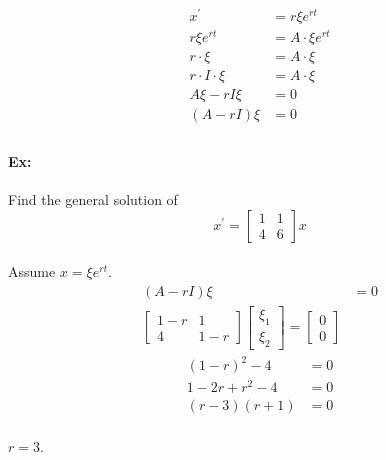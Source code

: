 \documentclass[letterpaper,12pt]{article}
\begin{document}
\begin{align*}
    x^{\prime} &= r\xi e^{rt}\\
    r\xi e^{rt}  &= A \cdot \xi e^{rt}\\
                r \cdot \xi&= A\cdot \xi\\
                           r \cdot I \cdot \xi&=A\cdot \xi\\
                                              A\xi - rI\xi&= 0\\
                                              (A-rI)\xi&=0\\
\end{align*}

\paragraph{Ex:}Find the general solution of 
\[
    x^{\prime}=
    \begin{bmatrix}
        1&1\\
        4&6
    \end{bmatrix}x
\]
\paragraph{}Assume $x = \xi e^{rt}$.
\begin{align*}
    (A-rI)\xi &= 0\\
    \begin{bmatrix}
        1-r & 1 \\
        4 & 1-r
    \end{bmatrix} 
              \begin{bmatrix}
                  \xi_1\\ \xi_2
              \end{bmatrix}= \begin{bmatrix}
    0\\0
    \end{bmatrix}
\end{align*}
\begin{align*}
    (1-r)^2 - 4 &= 0\\
    1-2r +r^2 -4&= 0\\
    (r-3)(r+1) &= 0
\end{align*}
\paragraph{}$r=3$.
\makeatletter
\renewcommand*\env@matrix[1][*\c@MaxMatrixCols c]{%
\hskip -\arraycolsep
\let\@ifnextchar\new@ifnextchar
\array{#1}}
\makeatother
\end{document}
